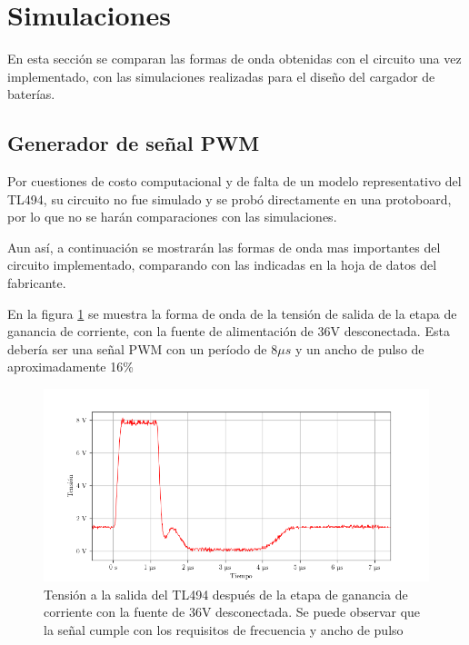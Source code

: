 \section{Simulaciones}

En esta sección se comparan las formas de onda obtenidas con el circuito una vez implementado, con las simulaciones realizadas para el diseño del cargador de baterías.

\subsection{Generador de señal PWM}

Por cuestiones de costo computacional y de falta de un modelo representativo del TL494,
su circuito no fue simulado y se probó directamente en una protoboard,
por lo que no se harán comparaciones con las simulaciones.

Aun así, a continuación se mostrarán las formas de onda mas importantes del circuito implementado,
comparando con las indicadas en la hoja de datos del fabricante.

En la figura \ref{fig:osc_pwm_vout_disconnected} se muestra la forma de onda de la tensión de salida de la etapa de ganancia de corriente, con la fuente de alimentación de 36V desconectada.
Esta debería ser una señal PWM con un período de $8\mu s$ y un ancho de pulso de aproximadamente 16\%

\begin{figure}[H]
    \centering
    \includegraphics[width=\textwidth]{images/capturas-osciloscopio/TL494/pwm_vout_disconnected.png}
    \caption{Tensión a la salida del TL494 después de la etapa de ganancia de corriente con la fuente de 36V desconectada. Se puede observar que la señal cumple con los requisitos de frecuencia y ancho de pulso}
    \label{fig:osc_pwm_vout_disconnected}
\end{figure}

